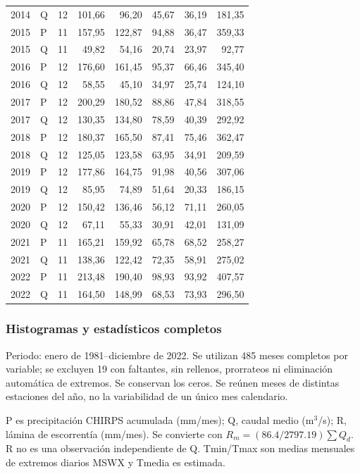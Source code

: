 \documentclass[10pt,a4paper]{article}
\begin{document}
\begin{longtable}{llrrrrrr}
2014 & Q & 12 & 101,66 & 96,20 & 45,67 & 36,19 & 181,35 \\
2015 & P & 11 & 157,95 & 122,87 & 94,88 & 36,47 & 359,33 \\
2015 & Q & 11 & 49,82 & 54,16 & 20,74 & 23,97 & 92,77 \\
2016 & P & 12 & 176,60 & 161,45 & 95,37 & 66,46 & 345,40 \\
2016 & Q & 12 & 58,55 & 45,10 & 34,97 & 25,74 & 124,10 \\
2017 & P & 12 & 200,29 & 180,52 & 88,86 & 47,84 & 318,55 \\
2017 & Q & 12 & 130,35 & 134,80 & 78,59 & 40,39 & 292,92 \\
2018 & P & 12 & 180,37 & 165,50 & 87,41 & 75,46 & 362,47 \\
2018 & Q & 12 & 125,05 & 123,58 & 63,95 & 34,91 & 209,59 \\
2019 & P & 12 & 177,86 & 164,75 & 91,98 & 40,56 & 307,06 \\
2019 & Q & 12 & 85,95 & 74,89 & 51,64 & 20,33 & 186,15 \\
2020 & P & 12 & 150,42 & 136,46 & 56,12 & 71,11 & 260,05 \\
2020 & Q & 12 & 67,11 & 55,33 & 30,91 & 42,01 & 131,09 \\
2021 & P & 11 & 165,21 & 159,92 & 65,78 & 68,52 & 258,27 \\
2021 & Q & 11 & 138,36 & 122,42 & 72,35 & 58,91 & 275,02 \\
2022 & P & 11 & 213,48 & 190,40 & 98,93 & 93,92 & 407,57 \\
2022 & Q & 11 & 164,50 & 148,99 & 68,53 & 73,93 & 296,50 \\
\end{longtable}\endgroup
\subsubsection*{Histogramas y estadísticos completos}
Periodo: enero de 1981--diciembre de 2022. Se utilizan 485 meses completos por
variable; se excluyen 19 con faltantes, sin rellenos, prorrateos ni eliminación
automática de extremos. Se conservan los ceros. Se reúnen meses de distintas
estaciones del año, no la variabilidad de un único mes calendario.

P es precipitación CHIRPS acumulada (mm/mes); Q, caudal medio (m$^3$/s);
R, lámina de escorrentía (mm/mes). Se convierte con
$R_m=(86.4/2797.19)\sum Q_d$. R no es una observación independiente de Q.
Tmin/Tmax son medias mensuales de extremos diarios MSWX y Tmedia es estimada.
\end{document}
